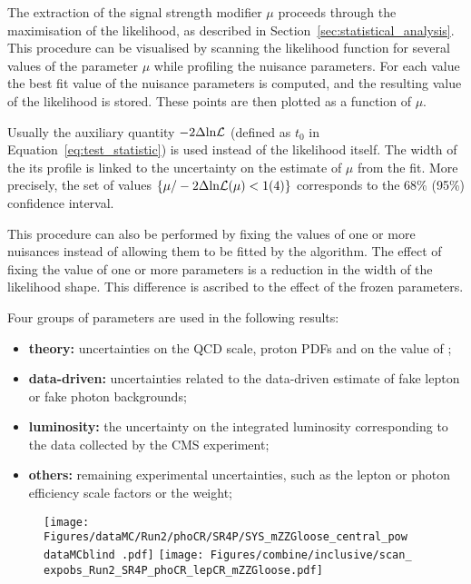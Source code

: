 \label{sec:likelihood_scans_inclusive}
The extraction of the signal strength modifier $\mu$ proceeds through the maximisation of the likelihood,
as described in Section~\ref{sec:statistical_analysis}.
This procedure can be visualised by scanning the likelihood function for several values of the parameter $\mu$ while profiling the nuisance parameters.
For each value the best fit value of the nuisance parameters is computed,
and the resulting value of the likelihood is stored.
These points are then plotted as a function of $\mu$.

Usually the auxiliary quantity $-2\Delta\text{ln}\mathcal{L}$ (defined as $t_0$ in Equation~\ref{eq:test_statistic})
is used instead of the likelihood itself.
The width of the its profile is linked to the uncertainty on the estimate of $\mu$ from the fit.
More precisely, the set of values $\{ \mu / -2\Delta\text{ln}\mathcal{L}(\mu) < 1 (4) \}$ corresponds to the 68\usep\% (95\usep\%) confidence interval.

This procedure can also be performed by fixing the values of one or more nuisances instead of allowing them to be fitted by the algorithm.
The effect of fixing the value of one or more parameters is a reduction in the width of the likelihood shape.
This difference is ascribed to the effect of the frozen parameters.

Four groups of parameters are used in the following results:
\begin{itemize}
\item \textbf{theory:} uncertainties on the QCD scale, proton PDFs and on the value of \alpS;
\item \textbf{data-driven:} uncertainties related to the data-driven estimate of fake lepton or fake photon backgrounds;
\item \textbf{luminosity:} the uncertainty on the integrated luminosity corresponding to the data collected by the CMS experiment;
\item \textbf{others:} remaining experimental uncertainties, such as the lepton or photon efficiency scale factors or the \pileup{} weight;
\end{itemize}

\begin{figure}
  \centering
  \texttt{[image: Figures/dataMC/Run2/phoCR/SR4P/SYS\_mZZGloose\_central\_pow\\dataMCblind .pdf]}
  \hfill
  \texttt{[image: Figures/combine/inclusive/scan\_\\expobs\_Run2\_SR4P\_phoCR\_lepCR\_mZZGloose.pdf]}
  \caption{}
  \label{fig:scan_Run2_SR4P_phoCR_lepCR_mZZGloose}
\end{figure}

